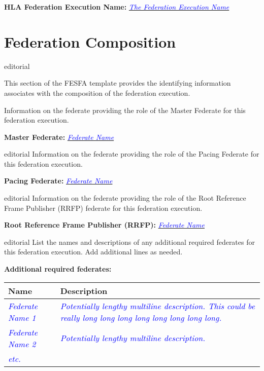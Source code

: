 \documentclass[11pt,english,letterpaper]{article}
\newcommand{\example}[1]{{\textcolor{blue}{\textit{#1}}}}
\begin{document}
\textbf{HLA Federation Execution Name: } \underline{\example{The Federation Execution Name}}


\section*{Federation Composition}

\begin{shownto}{editorial}
{\color{red} This section of the FESFA template provides the identifying
information associates with the composition of the federation execution.

Information on the federate providing the role of the Master Federate for this
federation execution.}
\end{shownto}

\textbf{Master Federate: }
\underline{\example{Federate Name}}

\begin{shownto}{editorial}
{\color{red} Information on the federate providing the role of the Pacing
Federate for this federation execution.}
\end{shownto}

\textbf{Pacing Federate: }
\underline{\example{Federate Name}}

\begin{shownto}{editorial}
{\color{red} Information on the federate providing the role of the Root
Reference Frame Publisher (RRFP) federate for this federation execution.}
\end{shownto}

\textbf{Root Reference Frame Publisher (RRFP): }
\underline{\example{Federate Name}}

\begin{shownto}{editorial}
{\color{red} List the names and descriptions of any additional required
federates for this federation execution. Add additional lines as needed.}
\end{shownto}

\textbf{Additional required federates: }

\begin{tabularx}{\textwidth}{|l|X|} \hline
\textbf{Name} & \textbf{Description} \\ \hline
\example{Federate Name 1} &
\example{Potentially lengthy multiline description.  This could be really long
long long long long long long long.} \\ \hline
\example{Federate Name 2} &
\example{Potentially lengthy multiline description.} \\ \hline
\example{etc.} &  \\ \hline
\end{tabularx}
\end{document}
